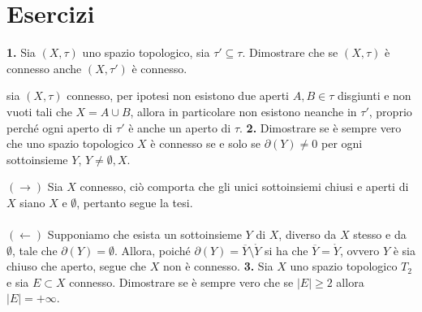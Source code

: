 \documentclass[oneside, 11pt]{amsbook}
\makeatletter
\newcommand{\0}{{(0)}}
\newcommand{\3}{{(3)}}
\theoremstyle{colonplain}
\theoremstyle{colondefinition}
\theoremstyle{colonremark}
\numberwithin{equation}{chapter}
\renewcommand{\proofname}{Dimostrazione}
\renewenvironment{proof}[1][\proofname]{\par
  \pushQED{\qed}%
  \normalfont \topsep6\p@\@plus6\p@\relax
  \trivlist
  \item[\hskip\labelsep\bfseries #1:]\ignorespaces
}{%
  \popQED\endtrivlist\@endpefalse
}
\makeatother
\begin{document}
\section{Esercizi}
\textbf{1.} Sia $(X, \tau)$ uno spazio topologico, sia $\tau' \subseteq \tau$. Dimostrare che se $(X, \tau)$ è connesso anche $(X, \tau')$ è connesso.
\begin{proof}
sia $(X, \tau)$ connesso, per ipotesi non esistono due aperti $A, B \in \tau$ disgiunti e non vuoti tali che $X = A \cup B$, allora in particolare non esistono neanche in $\tau'$, proprio perché ogni aperto di $\tau'$ è anche un aperto di $\tau$.
\end{proof}
\textbf{2.} Dimostrare se è sempre vero che uno spazio topologico $X$ è connesso se e solo se $\partial(Y) \neq 0$ per ogni sottoinsieme $Y$, $Y \neq \emptyset, X$.
\begin{proof}
$(\rightarrow)$ Sia $X$ connesso, ciò comporta che gli unici sottoinsiemi chiusi e aperti di $X$ siano $X$ e $\emptyset$, pertanto segue la tesi. \\ \\
$(\leftarrow)$ Supponiamo che esista un sottoinsieme $Y$ di $X$, diverso da $X$ stesso e da $\emptyset$, tale che $\partial(Y) = \emptyset$. Allora, poiché $\partial(Y) = \overline{Y} \setminus \mathring{Y}$ si ha che $\overline{Y} = \mathring{Y}$, ovvero $Y$ è sia chiuso che aperto, segue che $X$ non è connesso.
\end{proof}
\textbf{3.} Sia $X$ uno spazio topologico $T_2$ e sia $E \subset X$ connesso. Dimostrare se è sempre vero che se $|E| \geq 2$ allora $|E| = +\infty$.
\end{document}

